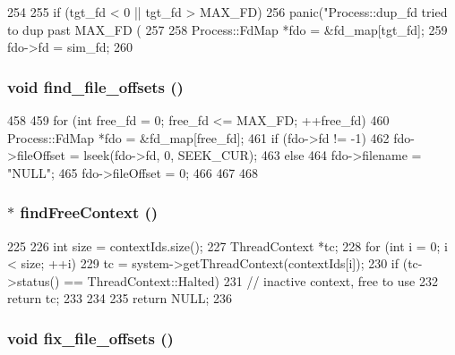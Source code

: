 \begin{DoxyCode}
254 {
255     if (tgt_fd < 0 || tgt_fd > MAX_FD)
256         panic("Process::dup_fd tried to dup past MAX_FD (%
257 
258     Process::FdMap *fdo = &fd_map[tgt_fd];
259     fdo->fd = sim_fd;
260 }
\end{DoxyCode}
\hypertarget{classProcess_aec771386421777782ca6bec97dd93db3}{
\subsubsection[{find\_\-file\_\-offsets}]{\setlength{\rightskip}{0pt plus 5cm}void find\_\-file\_\-offsets ()}}
\label{classProcess_aec771386421777782ca6bec97dd93db3}



\begin{DoxyCode}
458 {
459     for (int free_fd = 0; free_fd <= MAX_FD; ++free_fd) {
460         Process::FdMap *fdo = &fd_map[free_fd];
461         if (fdo->fd != -1) {
462             fdo->fileOffset = lseek(fdo->fd, 0, SEEK_CUR);
463         } else {
464                 fdo->filename = "NULL";
465                 fdo->fileOffset = 0;
466         }
467     }
468 }
\end{DoxyCode}
\hypertarget{classProcess_ac26b4f23be05f684886e00f4f7526a0e}{
\subsubsection[{findFreeContext}]{ $\ast$ findFreeContext ()}}
\label{classProcess_ac26b4f23be05f684886e00f4f7526a0e}



\begin{DoxyCode}
225 {
226     int size = contextIds.size();
227     ThreadContext *tc;
228     for (int i = 0; i < size; ++i) {
229         tc = system->getThreadContext(contextIds[i]);
230         if (tc->status() == ThreadContext::Halted) {
231             // inactive context, free to use
232             return tc;
233         }
234     }
235     return NULL;
236 }
\end{DoxyCode}
\hypertarget{classProcess_a65bfd573cf5c576db37f79195adb9cbc}{
\subsubsection[{fix\_\-file\_\-offsets}]{\setlength{\rightskip}{0pt plus 5cm}void fix\_\-file\_\-offsets ()}}
\label{classProcess_a65bfd573cf5c576db37f79195adb9cbc}



